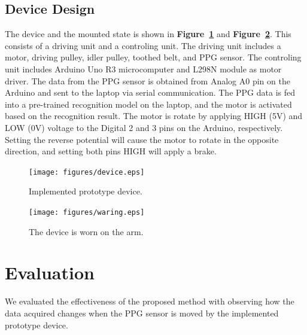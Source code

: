 \documentclass[sigconf]{acmart}
\newcommand\figref[1]{\textbf{Figure~\ref{fig:#1}}}
\begin{document}
\subsection{Device Design}
The device and the mounted state is shown in \figref{device} and \figref{waring}. This consists of a driving unit and a controling unit. The driving unit includes a motor, driving pulley, idler pulley, toothed belt, and PPG sensor. The controling unit includes Arduino Uno R3 microcomputer and L298N module as motor driver. The data from the PPG sensor is obtained from Analog A0 pin on the Arduino and sent to the laptop via serial communication. The PPG data is fed into a pre-trained recognition model on the laptop, and the motor is activated based on the recognition result. The motor is rotate by applying HIGH (5V) and LOW (0V) voltage to the Digital 2 and 3 pins on the Arduino, respectively. Setting the reverse potential will cause the motor to rotate in the opposite direction, and setting both pins HIGH will apply a brake.

\begin{figure}[!t]
  \centering
  \texttt{[image: figures/device.eps]}
  \caption{Implemented prototype device.}
  \label{fig:device}
\end{figure}

\begin{figure}[!t]
  \centering
  \texttt{[image: figures/waring.eps]}
  \caption{The device is worn on the arm.}
  \label{fig:waring}
\end{figure}



\section{Evaluation}
\label{sec:evaluation}
We evaluated the effectiveness of the proposed method with observing how the data acquired changes when the PPG sensor is moved by the implemented prototype device.
\end{document}
